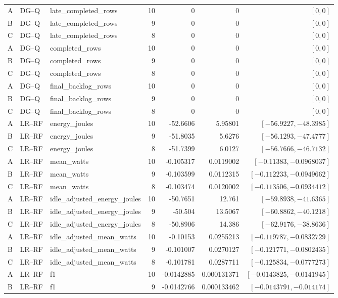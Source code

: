\begin{longtable}{lllrrrr}
A & DG--Q & late\_completed\_rows & 10 & 0 & 0 & $[0,0]$\\
B & DG--Q & late\_completed\_rows & 9 & 0 & 0 & $[0,0]$\\
C & DG--Q & late\_completed\_rows & 8 & 0 & 0 & $[0,0]$\\
A & DG--Q & completed\_rows & 10 & 0 & 0 & $[0,0]$\\
B & DG--Q & completed\_rows & 9 & 0 & 0 & $[0,0]$\\
C & DG--Q & completed\_rows & 8 & 0 & 0 & $[0,0]$\\
A & DG--Q & final\_backlog\_rows & 10 & 0 & 0 & $[0,0]$\\
B & DG--Q & final\_backlog\_rows & 9 & 0 & 0 & $[0,0]$\\
C & DG--Q & final\_backlog\_rows & 8 & 0 & 0 & $[0,0]$\\
A & LR--RF & energy\_joules & 10 & -52.6606 & 5.95801 & $[-56.9227,-48.3985]$\\
B & LR--RF & energy\_joules & 9 & -51.8035 & 5.6276 & $[-56.1293,-47.4777]$\\
C & LR--RF & energy\_joules & 8 & -51.7399 & 6.0127 & $[-56.7666,-46.7132]$\\
A & LR--RF & mean\_watts & 10 & -0.105317 & 0.0119002 & $[-0.11383,-0.0968037]$\\
B & LR--RF & mean\_watts & 9 & -0.103599 & 0.0112315 & $[-0.112233,-0.0949662]$\\
C & LR--RF & mean\_watts & 8 & -0.103474 & 0.0120002 & $[-0.113506,-0.0934412]$\\
A & LR--RF & idle\_adjusted\_energy\_joules & 10 & -50.7651 & 12.761 & $[-59.8938,-41.6365]$\\
B & LR--RF & idle\_adjusted\_energy\_joules & 9 & -50.504 & 13.5067 & $[-60.8862,-40.1218]$\\
C & LR--RF & idle\_adjusted\_energy\_joules & 8 & -50.8906 & 14.386 & $[-62.9176,-38.8636]$\\
A & LR--RF & idle\_adjusted\_mean\_watts & 10 & -0.10153 & 0.0255213 & $[-0.119787,-0.0832729]$\\
B & LR--RF & idle\_adjusted\_mean\_watts & 9 & -0.101007 & 0.0270127 & $[-0.121771,-0.0802435]$\\
C & LR--RF & idle\_adjusted\_mean\_watts & 8 & -0.101781 & 0.0287711 & $[-0.125834,-0.0777273]$\\
A & LR--RF & f1 & 10 & -0.0142885 & 0.000131371 & $[-0.0143825,-0.0141945]$\\
B & LR--RF & f1 & 9 & -0.0142766 & 0.000133462 & $[-0.0143791,-0.014174]$\\

\end{longtable}
